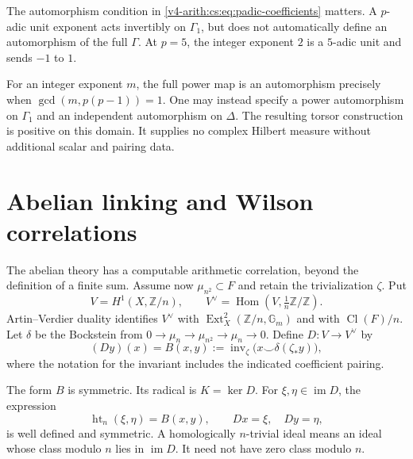 The automorphism condition in \eqref{v4-arith:cs:eq:padic-coefficients}
matters. A \(p\)-adic unit exponent acts invertibly on \(\Gamma_1\), but
does not automatically define an automorphism of the full \(\Gamma\). At
\(p=5\), the integer exponent \(2\) is a \(5\)-adic unit and sends \(-1\) to
\(1\).

For an integer exponent \(m\), the full power map is an automorphism
precisely when \(\gcd(m,p(p-1))=1\). One may instead specify a power
automorphism on \(\Gamma_1\) and an independent automorphism on \(\Delta\).
The resulting torsor construction is positive on this domain. It supplies no
complex Hilbert measure without additional scalar and pairing data.

\section{Abelian linking and Wilson correlations}
\label{v4-arith:cs:linking}

The abelian theory has a computable arithmetic correlation, beyond the
definition of a finite sum. Assume now \(\mu_{n^2}\subset F\) and retain the
trivialization \(\zeta\). Put
\[
 V=H^1(X,\mathbb Z/n),\qquad
 V^\vee=\operatorname{Hom}(V,\tfrac1n\mathbb Z/\mathbb Z).
\]
Artin--Verdier duality identifies \(V^\vee\) with
\(\operatorname{Ext}^2_X(\mathbb Z/n,\mathbb G_m)\) and with
\(\operatorname{Cl}(F)/n\). Let \(\delta\) be the Bockstein from
\(0\to\mu_n\to\mu_{n^2}\to\mu_n\to0\). Define \(D:V\to V^\vee\) by
\begin{equation}
 (Dy)(x)=B(x,y)
   :=\operatorname{inv}_\zeta\bigl(x\smile\delta(\zeta_*y)\bigr),
 \label{v4-arith:cs:eq:linking-form}
\end{equation}
where the notation for the invariant includes the indicated coefficient
pairing.

\begin{proposition}
\label{v4-arith:cs:prop:linking}
The form \(B\) is symmetric. Its radical is \(K=\ker D\). For
\(\xi,\eta\in\operatorname{im}D\), the expression
\[
 \operatorname{ht}_n(\xi,\eta)=B(x,y),
 \qquad Dx=\xi,\quad Dy=\eta,
\]
is well defined and symmetric. A homologically \(n\)-trivial ideal means an
ideal whose class modulo \(n\) lies in \(\operatorname{im}D\). It need not
have zero class modulo \(n\).
\end{proposition}

